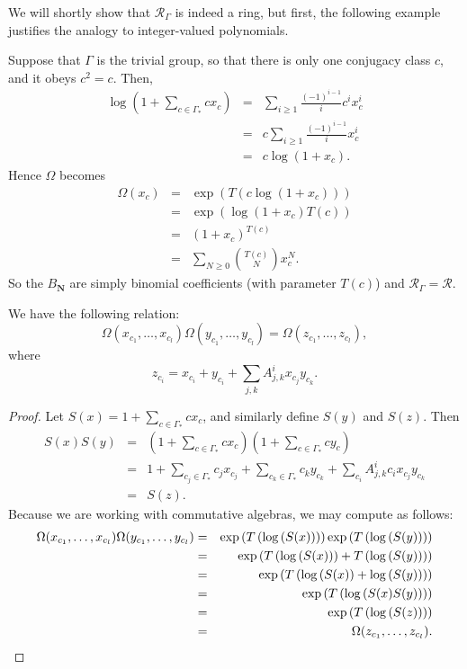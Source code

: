 \documentclass[ALCO,Unicode]{cedram}
\newcommand{\RGamma}{\mathcal{R}_{\Gamma}}
\newcommand{\RGamma}{\mathcal{R}_{\Gamma}}
\begin{document}
We will shortly show that $\RGamma$ is indeed a ring, but first, the following example justifies the analogy to integer-valued polynomials.
\begin{example} \label{trivial_rg_example}
Suppose that $\Gamma$ is the trivial group, so that there is only one conjugacy class $c$, and it obeys $c^2 = c$. Then,
\begin{eqnarray*}
\log\left(1 + \sum_{c \in \Gamma_*} c x_c\right) &=& 
\sum_{i\geq 1} \frac{(-1)^{i-1}}{i} c^i x_c^i \\
&=& c \sum_{i\geq 1} \frac{(-1)^{i-1}}{i} x_c^i \\
&=& c \log(1+x_c).
\end{eqnarray*}
Hence $\Omega$ becomes
\begin{eqnarray*}
\Omega(x_{c}) &=& \exp(T(c \log(1+x_c))) \\
&=& \exp(\log(1+x_c) T(c)) \\
&=& (1+x_c)^{T(c)} \\
&=& \sum_{N \geq 0} \binom{T(c)}{N} x_c^N.
\end{eqnarray*}
So the $B_{\mathbf{N}}$ are simply binomial coefficients (with parameter $T(c)$) and $\RGamma = \mathcal{R}$.
\end{example}

\begin{proposition} \label{theta_product_prop}
We have the following relation:
\[
\Omega(x_{c_1}, \ldots, x_{c_l}) \Omega(y_{c_1}, \ldots, y_{c_l}) = \Omega(z_{c_1}, \ldots, z_{c_l}),
\]
where
\[
z_{c_i} = x_{c_i} + y_{c_i} + \sum_{j,k}A_{j,k}^{i}x_{c_j} y_{c_k}.
\]
\end{proposition}
\begin{proof}
Let $S(x) = 1 + \sum_{c \in \Gamma_*} c x_c$, and similarly define $S(y)$ and $S(z)$. Then
\begin{eqnarray*}
S(x)S(y) &=& \left(1 + \sum_{c \in \Gamma_*} c x_c\right)\left(1 + \sum_{c \in \Gamma_*} c y_c\right) \\
&=& 1 + \sum_{c_j \in \Gamma_*} c_j x_{c_j} + \sum_{c_k \in \Gamma_*} c_k y_{c_k} + \sum_{c_i} A_{j,k}^i c_i x_{c_j}y_{c_k} \\
&=& S(z).
\end{eqnarray*}
Because we are working with commutative algebras, we may compute as follows:
\begin{eqnarray*}
\Omega(x_{c_1}, \ldots, x_{c_l}) \Omega(y_{c_1}, \ldots, y_{c_l})
&=& \exp\left(T\left(\log\left(S(x)\right)\right)\right) \exp\left(T\left(\log\left(S(y)\right)\right)\right) \\
&=& \exp\left(T\left(\log\left(S(x)\right)\right) + T\left(\log\left(S(y)\right)\right)\right) \\
&=&\exp\left(T\left(\log\left(S(x)\right)+\log\left(S(y)\right)\right)\right) \\
&=&\exp\left(T\left(\log\left(S(x)S(y)\right)\right)\right) \\
&=&\exp\left(T\left(\log\left(S(z)\right)\right)\right) \\
&=& \Omega(z_{c_1}, \ldots, z_{c_l}).\qedhere
\end{eqnarray*}
\end{proof}
\end{document}
